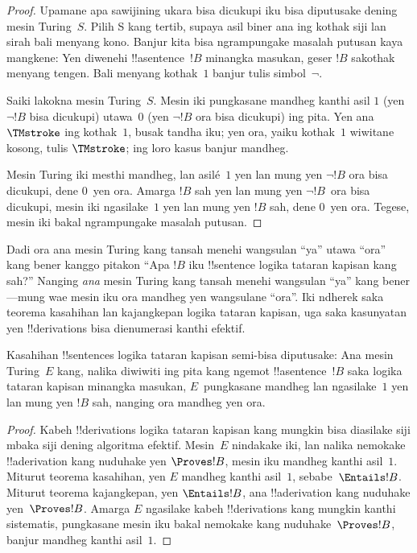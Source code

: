 \documentclass[../../../include/open-logic-section]{subfiles}
\begin{document}
\begin{proof}
  Upamane apa sawijining ukara bisa dicukupi iku bisa diputusake
  dening mesin Turing~$S$. Pilih S kang tertib, supaya asil biner ana ing kothak siji lan sirah bali menyang kono. Banjur kita bisa ngrampungake
  masalah putusan kaya mangkene: Yen diwenehi
  !!a{sentence}~$!B$ minangka masukan, geser $!B$
  sakothak menyang tengen. Bali menyang kothak~$1$
  banjur tulis simbol~$\lnot$.

  Saiki lakokna mesin Turing~$S$. Mesin iki pungkasane mandheg
  kanthi asil $1$ (yen $\lnot !B$ bisa dicukupi) utawa~$0$
  (yen $\lnot !B$ ora bisa dicukupi) ing pita. Yen ana
  $\TMstroke$ ing kothak~$1$, busak tandha iku;
  yen ora, yaiku kothak~$1$ wiwitane kosong, tulis $\TMstroke$;
  ing loro kasus banjur mandheg.

  Mesin Turing iki mesthi mandheg, lan asilé~$1$ yen lan
  mung yen $\lnot !B$ ora bisa dicukupi, dene $0$~yen ora.
  Amarga $!B$ sah yen lan mung yen $\lnot !B$~ora bisa
  dicukupi, mesin iki ngasilake~$1$ yen lan mung yen
  $!B$ sah, dene $0$~yen ora. Tegese, mesin iki bakal
  ngrampungake masalah putusan.
\end{proof}

\begin{explain}
Dadi ora ana mesin Turing kang tansah menehi wangsulan
``ya'' utawa ``ora'' kang bener kanggo pitakon
``Apa $!B$ iku !!{sentence} logika tataran kapisan kang sah?''
Nanging \emph{ana} mesin Turing kang tansah menehi
wangsulan ``ya'' kang bener---mung wae mesin iku ora
mandheg yen wangsulane ``ora''. Iki ndherek saka
teorema kasahihan lan kajangkepan logika tataran kapisan,
uga saka kasunyatan yen !!{derivation}s bisa
dienumerasi kanthi efektif.
\end{explain}

\begin{thm}
  Kasahihan !!{sentence}s logika tataran kapisan semi-bisa
  diputusake: Ana mesin Turing~$E$ kang, nalika diwiwiti
  ing pita kang ngemot !!a{sentence}~$!B$ saka logika
  tataran kapisan minangka masukan, $E$~pungkasane mandheg lan
  ngasilake~$1$ yen lan mung yen $!B$ sah, nanging ora
  mandheg yen ora.
\end{thm}

\begin{proof}
  Kabeh !!{derivation}s logika tataran kapisan kang mungkin
  bisa diasilake siji mbaka siji dening algoritma efektif.
  Mesin~$E$ nindakake iki, lan nalika nemokake
  !!a{derivation} kang nuduhake yen $\Proves
  !B$, mesin iku mandheg kanthi asil~$1$.
  Miturut teorema kasahihan, yen $E$ mandheg kanthi
  asil~$1$, sebabe~$\Entails !B$. Miturut teorema
  kajangkepan, yen $\Entails !B$, ana !!a{derivation}
  kang nuduhake yen~$\Proves !B$. Amarga $E$
  ngasilake kabeh !!{derivation}s kang mungkin
  kanthi sistematis, pungkasane mesin iku bakal
  nemokake kang nuduhake~$\Proves !B$,
  banjur mandheg kanthi asil~$1$.
\end{proof}
\end{document}
